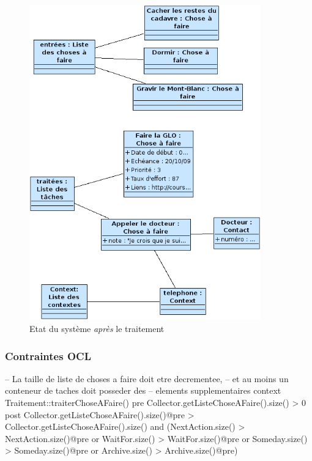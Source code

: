 \begin{figure}[!ht]
\begin{center}
\includegraphics[width=10cm]{images/Instantane_Process_2.png}
\caption{Etat du système \emph{après} le traitement}
\label{process2}
\end{center}
\end{figure}

\subsubsection{Contraintes OCL}

\begin{ocl}
-- La taille de liste de choses a faire doit etre decrementee,
-- et au moins un conteneur de taches doit posseder des
-- elements supplementaires
context Traitement::traiterChoseAFaire()
pre Collector.getListeChoseAFaire().size() > 0
post Collector.getListeChoseAFaire().size()@pre >
		Collector.getListeChoseAFaire().size()
	and (NextAction.size() > NextAction.size()@pre
	or WaitFor.size() > WaitFor.size()@pre
	or Someday.size() > Someday.size()@pre
	or Archive.size() > Archive.size()@pre)
\end{ocl}

